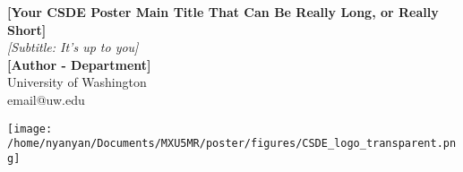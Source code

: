 \documentclass[a0,portrait]{a0poster}
\begin{document}


\begin{minipage}[b]{0.67\linewidth}
\veryHuge \color{Crimson} \textbf{[Your CSDE Poster Main Title That Can Be Really Long, or Really Short]} \color{Black}\\ %
\Huge\textit{[Subtitle: It's up to you]}\\[2cm] %
\huge \textbf{[Author - Department]}\\[0.5cm] %
\huge University of Washington\\[0.4cm] %
\Large email@uw.edu\\
\end{minipage}
%
\begin{minipage}[b]{0.33\linewidth}
\texttt{[image: /home/nyanyan/Documents/MXU5MR/poster/figures/CSDE\_logo\_transparent.png]}\\
\end{minipage}

\vspace{1cm} %



\end{document}
